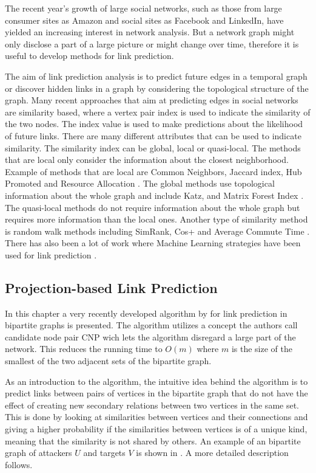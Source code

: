 The recent year's growth of large social networks, such as those from large consumer sites as Amazon and social sites as Facebook and LinkedIn, have yielded an increasing interest in network analysis. But a network graph might only disclose a part of a large picture or might change over time, therefore it is useful to develop methods for link prediction.

The aim of link prediction analysis is to predict future edges in a temporal graph or discover hidden links in a graph by considering the topological structure of the graph. Many recent approaches that aim at predicting edges in social networks are similarity based, where a vertex pair index is used to indicate the similarity of the two nodes. The index value is used to make predictions about the likelihood of future links. There are many different attributes that can be used to indicate similarity. The similarity index can be global, local or quasi-local. The methods that are local only consider the information about the closest neighborhood. Example of methods that are local are Common Neighbors, Jaccard index, Hub Promoted and Resource Allocation \cite{linkpredict}. The global methods use topological information about the whole graph and include Katz, and Matrix Forest Index \cite{linkpredict}. The quasi-local methods do not require information about the whole graph but requires more information than the local ones. Another type of similarity method is random walk methods including SimRank, Cos+ and Average Commute Time \cite{linkpredict}. There has also been a lot of work where Machine Learning strategies have been used for link prediction \cite{mlpredict1,mlpredict2,mlpredict3,mlpredict4,mlpredict5,mlpredict6,mlpredict7}.

\subsection{Projection-based Link Prediction}\label{sec:plp}
In this chapter a very recently developed algorithm by \citet{plp} for link prediction in bipartite graphs is presented. The algorithm utilizes a concept the authors call candidate node pair CNP wich lets the algorithm disregard a large part of the network. This reduces the running time to $O(m)$ where $m$ is the size of the smallest of the two adjacent sets of the bipartite graph.

As an introduction to the algorithm, the intuitive idea behind the algorithm is to predict links between pairs of vertices in the bipartite graph that do not have the effect of creating new secondary relations between two vertices in the same set. This is done by looking at similarities between vertices and their connections and giving a higher probability if the similarities between vertices is of a unique kind, meaning that the similarity is not shared by others. An example of an bipartite graph of attackers $U$ and targets $V$ is shown in . A more detailed description follows.


